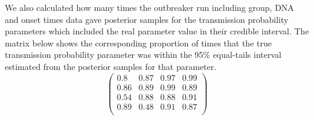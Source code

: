 \documentclass[11pt,a4paper]{report}
\begin{document}
We also calculated how many times the outbreaker run including group, DNA and onset times data gave posterior samples for the transmission probability parameters which included the real parameter value in their credible interval. The matrix below shows the corresponding proportion of times that the true transmission probability parameter was within the 95\% equal-tails interval estimated from the posterior samples for that parameter.
\begin{equation}
\begin{pmatrix}
0.8 & 0.87 & 0.97 & 0.99 \\
0.86 & 0.89 & 0.99 & 0.89 \\
0.54 & 0.88 & 0.88 & 0.91 \\
0.89 & 0.48 & 0.91 & 0.87 \\
\end{pmatrix}
\end{equation}
\end{document}
